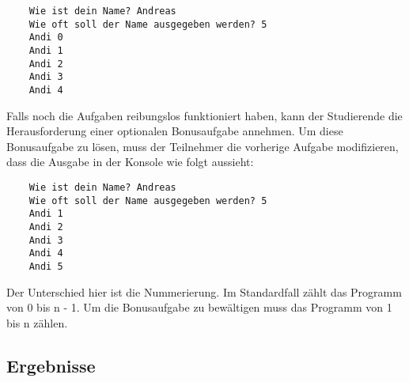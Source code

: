 \begin{lstlisting}
    Wie ist dein Name? Andreas
    Wie oft soll der Name ausgegeben werden? 5
    Andi 0
    Andi 1
    Andi 2
    Andi 3
    Andi 4
\end{lstlisting}

Falls noch die Aufgaben reibungslos funktioniert haben, kann der Studierende
die Herausforderung einer optionalen Bonusaufgabe annehmen. Um diese
Bonusaufgabe zu lösen, muss der Teilnehmer die vorherige Aufgabe modifizieren,
dass die Ausgabe in der Konsole wie folgt aussieht:

\begin{lstlisting}
    Wie ist dein Name? Andreas
    Wie oft soll der Name ausgegeben werden? 5
    Andi 1
    Andi 2
    Andi 3
    Andi 4
    Andi 5
\end{lstlisting}

Der Unterschied hier ist die Nummerierung. Im Standardfall zählt das Programm
von 0 bis n - 1. Um die Bonusaufgabe zu bewältigen muss das Programm von 1 bis n
zählen.

\subsection{Ergebnisse}
